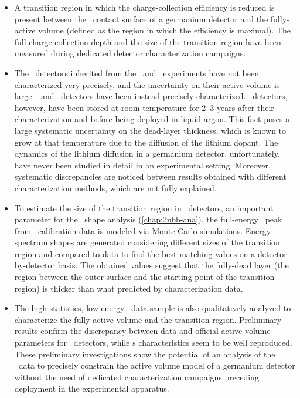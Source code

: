 \chapsummary
\begin{itemize}
  \item A transition region in which the charge-collection efficiency is reduced is
    present between the \nplus\ contact surface of a germanium detector
    and the fully-active volume (defined as the region in which the efficiency is
    maximal). The full charge-collection depth and the size of the transition region have
    been measured during dedicated detector characterization campaigns.
  \item The \scoax\ detectors inherited from the \hdm\ and \igex\ experiments have not
    been characterized very precisely, and the uncertainty on their active volume is
    large. \bege\ and \icoax\ detectors have been instead precisely characterized. \bege\
    detectors, however, have been stored at room temperature for 2--3 years after their
    characterization and before being deployed in liquid argon. This fact poses a large
    systematic uncertainty on the dead-layer thickness, which is known to grow at that
    temperature due to the diffusion of the lithium dopant. The dynamics of the lithium
    diffusion in a germanium detector, unfortunately, have never been studied in detail in
    an experimental setting. Moreover, systematic discrepancies are noticed between
    results obtained with different characterization methods, which are not fully
    explained.
  \item To estimate the size of the transition region in \bege\ detectors, an important
    parameter for the \nnbb\ shape analysis (\cref{chap:2nbb-ana}), the
    full-energy \Tl\ peak from \Th\ calibration data is modeled via Monte Carlo
    simulations. Energy spectrum shapes are generated considering different sizes of the
    transition region and compared to data to find the best-matching values on a
    detector-by-detector basis. The obtained values suggest that the fully-dead layer (the
    region between the outer surface and the starting point of the transition region) is
    thicker than what predicted by characterization data.
  \item The high-statistics, low-energy \Arl\ data sample is also qualitatively analyzed
    to characterize the fully-active volume and the transition region. Preliminary results
    confirm the discrepancy between data and official active-volume parameters for \bege\
    detectors, while \icoax{}s characteristics seem to be well reproduced. These
    preliminary investigations show the potential of an analysis of the \Arl\ data to
    precisely constrain the active volume model of a germanium detector without the need
    of dedicated characterization campaigns preceding deployment in the experimental
    apparatus.
\end{itemize}

